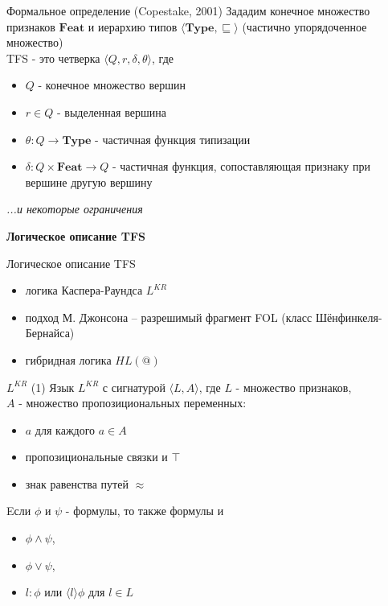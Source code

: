 \documentclass{beamer}
\begin{document}
\begin{frame}{Формальное определение (Copestake, 2001)}
Зададим конечное множество признаков $\textbf{Feat}$ и иерархию типов $\langle \textbf{Type}, \sqsubseteq \rangle$ (частично упорядоченное множество)\\
\bigskip
TFS - это четверка $\langle Q, r, \delta, \theta \rangle$, где
\begin{itemize}
	\item $Q$ - конечное множество вершин
	\item $r \in Q$ - выделенная вершина
	\item $\theta : Q \to \textbf{Type}$ - частичная функция типизации
	\item $\delta : Q \times \textbf{Feat} \to Q$ - частичная функция, сопоставляющая признаку при вершине другую вершину
\end{itemize}
\bigskip
{\footnotesize \textit{...и некоторые ограничения}}
\end{frame}

\begin{frame}{}
\begin{center}
	\textbf{Логическое описание TFS}
\end{center}
\end{frame}

\begin{frame}{Логическое описание TFS}
\begin{itemize}
	\item логика Каспера-Раундса $L^{KR}$
	\item подход М. Джонсона -- разрешимый фрагмент FOL (класс Шёнфинкеля-Бернайса) 
	\item гибридная логика $HL(@)$
\end{itemize}
\end{frame}

\begin{frame}{$L^{KR}$ (1)}
Язык $L^{KR}$ с сигнатурой $\langle L, A \rangle$, где $L$ - множество признаков, \\$A$ - множество пропозициональных переменных:\\
\bigskip
\begin{itemize}
	\item $a$ для каждого $a \in A$
	\item пропозициональные связки и $\top$
	\item знак равенства путей $\approx$
\end{itemize}
\bigskip	
Eсли $\phi$ и $\psi$ - формулы, то также формулы и 
\begin{itemize}
	\item $\phi \wedge \psi$,
	\item $\phi \vee \psi$,
	\item $l : \phi$ или $\langle l \rangle \phi$ для $l \in L$
\end{itemize}
\end{frame}
\end{document}
